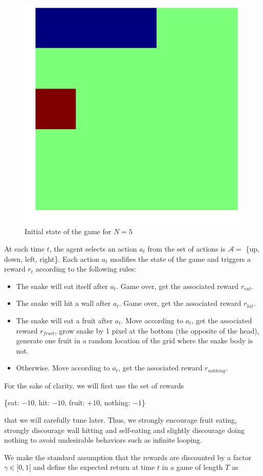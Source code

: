 \documentclass{article}
\begin{document}
\begin{figure}[!htpb]
\centering
\includegraphics[width=.4\linewidth]{snake_initial_state.png}
\caption{Initial state of the game for $N = 5$}
\label{snake_init}
\end{figure}

At each time $t$, the agent selects an action $a_t$ from the set of actions is $\mathcal A =$ \{up, down, left, right\}. Each action $a_t$ modifies the state of the game and triggers a reward $r_t$ according to the following rules:

\begin{itemize}
\item The snake will eat itself after $a_t$. Game over, get the associated reward $r_{{eat}}$.
\item The snake will hit a wall after $a_t$. Game over, get the associated reward $r_{{hit}}$.
\item The snake will eat a fruit after $a_t$. Move according to $a_t$, get the associated reward $r_{{fruit}}$, grow snake by 1 pixel at the bottom (the opposite of the head), generate one fruit in a random location of the grid where the snake body is not.
\item Otherwise. Move according to $a_t$, get the associated reward $r_{{nothing}}$.
\end{itemize}

For the sake of clarity, we will first use the set of rewards

\begin{center}
\{{eat}: $-10$, {hit}: $-10$, {fruit}: $+10$, {nothing}: $-1$\}
\end{center}

that we will carefully tune later. Thus, we strongly encourage fruit eating, strongly discourage wall hitting and self-eating and slightly discourage doing nothing to avoid undesirable behaviors such as infinite looping.

We make the standard assumption that the rewards are discounted by a factor $\gamma \in [0, 1[$ and define the expected return at time $t$ in a game of length $T$ as
\end{document}
